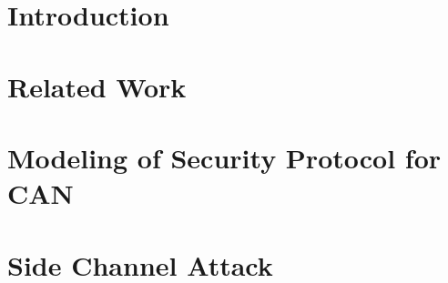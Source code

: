 \documentclass[sigconf]{acmart}
\begin{document}

%
%




\maketitle

\section{Introduction} \label{sec:intro}


\section{Related Work} \label{sec:related}


\section{Modeling of Security Protocol for CAN} \label{sec:model}


\section{Side Channel Attack} \label{sec:property}



%





%

% 


% 

% 



\end{document}
